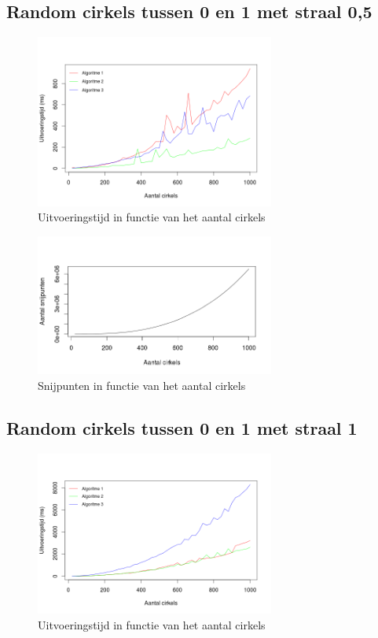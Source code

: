 \documentclass[11pt,a4paper]{article}
\begin{document}
\subsection{Random cirkels tussen 0 en 1 met straal 0,5}
\begin{figure}[H]
\centering
\includegraphics[width=0.7\textwidth]{uitvoeringstijd_05.png}
\caption*{Uitvoeringstijd in functie van het aantal cirkels}
\end{figure}

\begin{figure}[H]
\centering
\includegraphics[width=0.7\textwidth]{snijpunten_05.png}
\caption*{Snijpunten in functie van het aantal cirkels}
\end{figure}

\subsection{Random cirkels tussen 0 en 1 met straal 1}
\begin{figure}[H]
\centering
\includegraphics[width=0.7\textwidth]{uitvoeringstijd_10.png}
\caption*{Uitvoeringstijd in functie van het aantal cirkels}
\end{figure}
\end{document}
